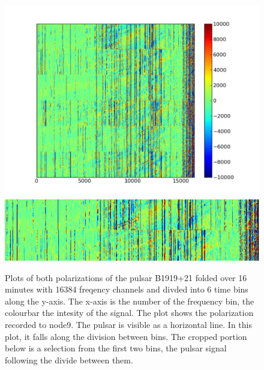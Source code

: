 \documentclass[a4paper,12pt]{article}
\begin{document}
\begin{figure}
\centering
\includegraphics[width=\linewidth]{1919fig1node9.pdf}
\includegraphics[width=\linewidth]{1919fig1node9crop.pdf}
\label{fig:folding1919}
\caption{Plots of both polarizations of the pulsar B1919+21 folded over 16 minutes with 16384 freqency channels and divded into 6 time bins along the y-axis. The x-axis is the number of the frequency bin, the colourbar the intesity of the signal. The plot shows the polarization recorded to node9. The pulsar is visible as a horizontal line. In this plot, it falls along the division between bins. The cropped portion below is a selection from the first two bins, the pulsar signal following the divide between them.}
\end{figure}

 
\end{document}
